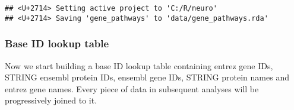\begin{verbatim}
## <U+2714> Setting active project to 'C:/R/neuro'
## <U+2714> Saving 'gene_pathways' to 'data/gene_pathways.rda'
\end{verbatim}

\begin{table}[H]
\centering
{}
\end{table}

\hypertarget{base-id-lookup-table}{%
\subsubsection{Base ID lookup table}\label{base-id-lookup-table}}

Now we start building a base ID lookup table containing entrez gene IDs,
STRING ensembl protein IDs, ensembl gene IDs, STRING protein names and
entrez gene names. Every piece of data in subsequent analyses will be
progressively joined to it.

